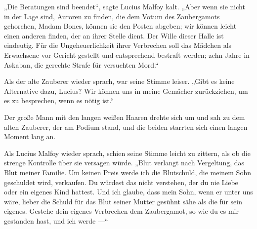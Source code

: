 „Die Beratungen sind beendet“, sagte Lucius Malfoy kalt.
„Aber wenn sie nicht in der Lage sind, Auroren zu finden, die dem Votum des Zaubergamots gehorchen, Madam Bones, können sie den Posten abgeben; wir können leicht einen anderen finden, der an ihrer Stelle dient. Der Wille dieser Halle ist eindeutig. Für die Ungeheuerlichkeit ihrer Verbrechen soll das Mädchen als Erwachsene vor Gericht gestellt und entsprechend bestraft werden; zehn Jahre in Askaban, die gerechte Strafe für versuchten Mord.“

Als der alte Zauberer wieder sprach, war seine Stimme leiser.
„Gibt es keine Alternative dazu, Lucius? Wir können uns in meine Gemächer zurückziehen, um es zu besprechen, wenn es nötig ist.“

Der große Mann mit den langen weißen Haaren drehte sich um und sah zu dem alten Zauberer, der am Podium stand, und die beiden starrten sich einen langen Moment lang an.

Als Lucius Malfoy wieder sprach, schien seine Stimme leicht zu zittern, als ob die strenge Kontrolle über sie versagen würde.
„Blut verlangt nach Vergeltung, das Blut meiner Familie. Um keinen Preis werde ich die Blutschuld, die meinem Sohn geschuldet wird, verkaufen. Du würdest das nicht verstehen, der du nie Liebe oder ein eigenes Kind hattest. Und ich glaube, dass mein Sohn, wenn er unter uns wäre, lieber die Schuld für das Blut seiner Mutter gesühnt sähe als die für sein eigenes. Gestehe dein eigenes Verbrechen dem Zaubergamot, so wie du es mir gestanden hast, und ich werde —“

